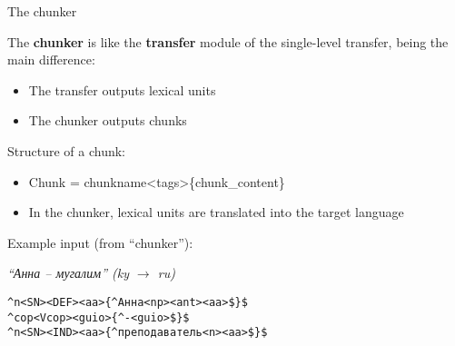 \documentclass[10pt,xetex]{beamer} %
\begin{document}
\begin{frame}{The chunker}

The \textbf{chunker} is like the \textbf{transfer} module of the single-level transfer, being the main difference:
\begin{itemize}
\item The transfer outputs \alert{lexical units}
\item The chunker outputs \alert{chunks}
\end{itemize}
Structure of a chunk:
\begin{itemize}
\item Chunk = chunkname<tags>\{chunk\_content\}


\item In the chunker, lexical units are translated into the target language


\end{itemize}
Example input (from ``chunker''):
\begin{exampleblock}{}
\emph{``Анна -- мугалим'' (ky $\rightarrow$ ru)} 
\begin{small}
\texttt{\^{}n<SN><DEF>{\color{blue}{<f>}}<aa>{\color{red}{<sg>}}{\color{green}{<nom>}}\{\^{}Анна<np><ant>{\color{blue}{<3>}}<aa>{\color{red}{<5>}{\color{green}{<6>}}}\$\}\$} \\
\texttt{\^{}cop<Vcop><guio>\{\^{}-<guio>\$\}\$} \\
\texttt{\^{}n<SN><IND>{\color{blue}{<GD>}}<aa>{\color{red}{<ND>}}{\color{green}{<nom>}}\{\^{}преподаватель<n>{\color{blue}{<3>}}<aa>{\color{red}{<5>}{\color{green}{<6>}}}\$\}\$}
\end{small}

\end{exampleblock}



\end{frame}
\end{document}
